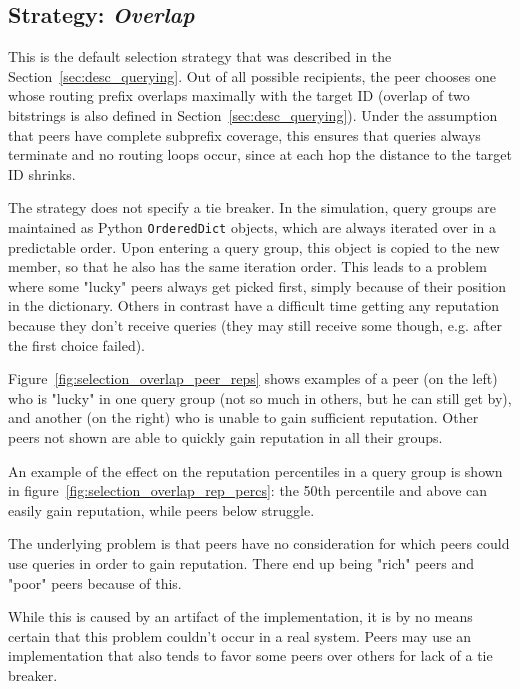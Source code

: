 \subsection{Strategy: \emph{Overlap}}
\label{sec:rep_avail_selection_overlap}
This is the default selection strategy that was described in the
Section~\ref{sec:desc_querying}. Out of all possible recipients, the peer
chooses one whose routing prefix overlaps maximally with the target ID (overlap
of two bitstrings is also defined in Section~\ref{sec:desc_querying}). Under the
assumption that peers have complete subprefix coverage, this ensures that
queries always terminate and no routing loops occur, since at each hop the
distance to the target ID shrinks.

The strategy does not specify a tie breaker. In the simulation, query groups are
maintained as Python \texttt{OrderedDict} objects, which are always iterated
over in a predictable order. Upon entering a query group, this object is copied
to the new member, so that he also has the same iteration order. This leads to a
problem where some "lucky" peers always get picked first, simply because of
their position in the dictionary. Others in contrast have a difficult time
getting any reputation because they don't receive queries (they may still
receive some though, e.g. after the first choice failed).

Figure~\ref{fig:selection_overlap_peer_reps} shows examples of a peer (on the
left) who is "lucky" in one query group (not so much in others, but he can still
get by), and another (on the right) who is unable to gain sufficient reputation.
Other peers not shown are able to quickly gain reputation in all their groups.

An example of the effect on the reputation percentiles in a query group is shown
in figure~\ref{fig:selection_overlap_rep_percs}: the 50th percentile and above
can easily gain reputation, while peers below struggle.

The underlying problem is that peers have no consideration for which peers could
use queries in order to gain reputation. There end up being "rich" peers and
"poor" peers because of this.

While this is caused by an artifact of the implementation, it is by no means
certain that this problem couldn't occur in a real system. Peers may use an
implementation that also tends to favor some peers over others for lack of a tie
breaker.

